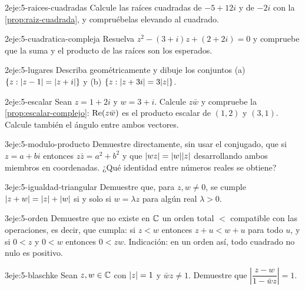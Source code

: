 \begin{ejercicio}{2}{eje:5-raices-cuadradas}
Calcule las raíces cuadradas de $-5+12i$ y de $-2i$ con la \cref{prop:raiz-cuadrada}, y compruébelas elevando al cuadrado.
\end{ejercicio}

\begin{ejercicio}{2}{eje:5-cuadratica-compleja}
Resuelva $z^{2}-(3+i)z+(2+2i)=0$ y compruebe que la suma y el producto de las raíces son los esperados.
\end{ejercicio}

\begin{ejercicio}{2}{eje:5-lugares}
Describa geométricamente y dibuje los conjuntos (a) $\{z:\lvert z-1\rvert=\lvert z+i\rvert\}$ y (b) $\{z:\lvert z+3i\rvert=3\lvert z\rvert\}$.
\end{ejercicio}

\begin{ejercicio}{2}{eje:5-escalar}
Sean $z=1+2i$ y $w=3+i$. Calcule $z\bar w$ y compruebe la \cref{prop:escalar-complejo}: $\operatorname{Re}(z\bar w)$ es el producto escalar de $(1,2)$ y $(3,1)$. Calcule también el ángulo entre ambos vectores.
\end{ejercicio}

\begin{ejercicio}{3}{eje:5-modulo-producto}
Demuestre directamente, sin usar el conjugado, que si $z=a+bi$ entonces $z\bar z=a^{2}+b^{2}$ y que $\lvert wz\rvert=\lvert w\rvert\lvert z\rvert$ desarrollando ambos miembros en coordenadas. ¿Qué identidad entre números reales se obtiene?
\end{ejercicio}

\begin{ejercicio}{3}{eje:5-igualdad-triangular}
Demuestre que, para $z,w\ne0$, se cumple $\lvert z+w\rvert=\lvert z\rvert+\lvert w\rvert$ si y solo si $w=\lambda z$ para algún real $\lambda>0$.
\end{ejercicio}

\begin{ejercicio}{3}{eje:5-orden}
Demuestre que no existe en $\mathbb{C}$ un orden total $<$ compatible con las operaciones, es decir, que cumpla: si $z<w$ entonces $z+u<w+u$ para todo $u$, y si $0<z$ y $0<w$ entonces $0<zw$. Indicación: en un orden así, todo cuadrado no nulo es positivo.
\end{ejercicio}

\begin{ejercicio}{3}{eje:5-blaschke}
Sean $z,w\in\mathbb{C}$ con $\lvert z\rvert=1$ y $\bar wz\ne1$. Demuestre que $\left|\dfrac{z-w}{1-\bar wz}\right|=1$.
\end{ejercicio}
